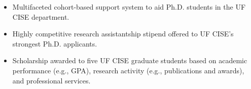 \begin{itemize}
\item Multifaceted cohort-based support system to aid Ph.D. students in the UF CISE department.
\end{itemize}
\begin{itemize}
\item Highly competitive research assistantship stipend offered to UF CISE’s strongest Ph.D. applicants.
\end{itemize}
\begin{itemize}
\item Scholarship awarded to five UF CISE graduate students based on academic performance (e.g., GPA), research activity (e.g., publications and awards), and professional services.
\end{itemize}
